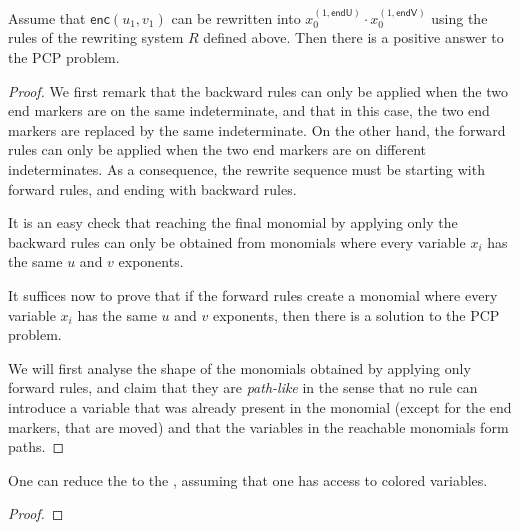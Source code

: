 \begin{lemma}
  \label{lem:reachable-correct}
  Assume that $\mathsf{enc} (u_1, v_1)$ can be rewritten into
  $x_0^{(1, \mathsf{endU})} \cdot x_0^{(1, \mathsf{endV})}$ using the rules of
  the rewriting system $R$ defined above.
  Then there is a positive answer to the PCP problem.
\end{lemma}
\begin{proof}

  We first remark that the backward rules can only be applied when the two end
  markers are on the same indeterminate, and that in this case, the two end
  markers are replaced by the same indeterminate. On the other hand, the
  forward rules can only be applied when the two end markers are on different
  indeterminates. As a consequence, the rewrite sequence must be starting with
  forward rules, and ending with backward rules.

   It is an easy check that reaching the final monomial by applying only the
   backward rules can only be obtained from monomials where every variable
   $x_i$ has the same $u$ and $v$ exponents.

   It suffices now to prove that if the forward rules create a monomial
   where every variable $x_i$ has the same $u$ and $v$ exponents, then
   there is a solution to the PCP problem.

   We will first analyse the shape of the monomials obtained by applying 
   only forward rules, and claim that they are \emph{path-like}
   in the sense that no rule can introduce a variable that was already present
   in the monomial (except for the end markers, that are moved)
   and that the variables in the reachable monomials form paths.


\end{proof}

\begin{theorem}
  \label{thm:undecidable-pcp}
  One can reduce the  to the
  , assuming that one
  has access to colored variables.
\end{theorem}
\begin{proof}
  
\end{proof}



